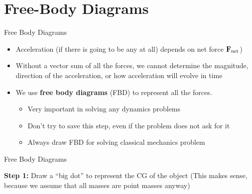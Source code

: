 \documentclass[12pt,compress,aspectratio=169]{beamer}
\newcommand{\mb}[1]{\ensuremath\mathbf{#1}}
\begin{document}
\section{Free-Body Diagrams}


\begin{frame}{Free Body Diagrams}
  \begin{itemize}
  \item Acceleration (if there is going to be any at all) depends
    on net force $\mb{F}_\mathrm{net}$)
  \item Without a vector sum of all the forces, we cannot determine the
    magnitude, direction of the acceleration, or how acceleration will evolve
    in time
  \item We use \textbf{free body diagrams} (FBD) to represent all the forces.
    \begin{itemize}
    \item Very important in solving any dynamics problems
    \item Don't try to save this step, even if the problem does not ask for it
    \item Always draw FBD for solving classical mechanics problem
    \end{itemize}
  \end{itemize}
\end{frame}



\begin{frame}{Free Body Diagrams}

  \textbf{Step 1:} Draw a ``big dot'' to represent the CG of the
  object (This makes sense, because we assume that all masses are point masses
  anyway)

  \begin{center}
  \end{center}

\end{frame}
\end{document}
